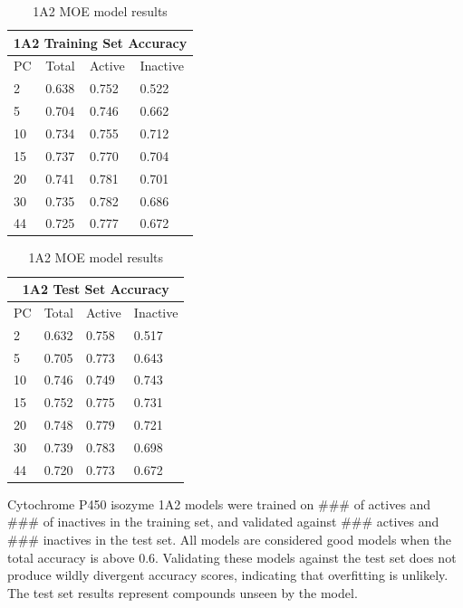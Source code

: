 \begin{table}[!h]
\begin{minipage}{.5\linewidth}
\centering
\begin{tabular}{|l|l|l|l|}
\hline
\multicolumn{4}{|c|}{1A2 Training Set Accuracy}   \\ \hline
PC & Total          & Active          & Inactive  \\ \hline
2  & 0.638          & 0.752           & 0.522     \\ \hline
5  & 0.704          & 0.746           & 0.662     \\ \hline
10 & 0.734          & 0.755           & 0.712     \\ \hline
15 & 0.737          & 0.770           & 0.704     \\ \hline
20 & 0.741          & 0.781           & 0.701     \\ \hline
30 & 0.735          & 0.782           & 0.686     \\ \hline
44 & 0.725          & 0.777           & 0.672     \\ \hline
\end{tabular}
\end{minipage}
\begin{minipage}{.5\linewidth}
\centering
\begin{tabular}{|l|l|l|l|}
\hline
\multicolumn{4}{|c|}{1A2 Test Set Accuracy}     \\ \hline
PC & Total          & Active          & Inactive \\ \hline
2  & 0.632          & 0.758           & 0.517   \\ \hline
5  & 0.705          & 0.773           & 0.643   \\ \hline
10 & 0.746          & 0.749           & 0.743   \\ \hline
15 & 0.752          & 0.775           & 0.731   \\ \hline
20 & 0.748          & 0.779           & 0.721   \\ \hline
30 & 0.739          & 0.783           & 0.698   \\ \hline
44 & 0.720          & 0.773           & 0.672   \\ \hline
\end{tabular}
\end{minipage}
\caption{1A2 MOE model results}
\end{table}

Cytochrome P450 isozyme 1A2 models were trained on ### of actives and ### of inactives in the training set, and validated against ### actives and ### inactives in the test set. All models are considered good models when the  total accuracy is above 0.6. Validating these models against the test set does not produce wildly divergent accuracy scores, indicating that overfitting is unlikely. The test set results represent compounds unseen by the model. 

